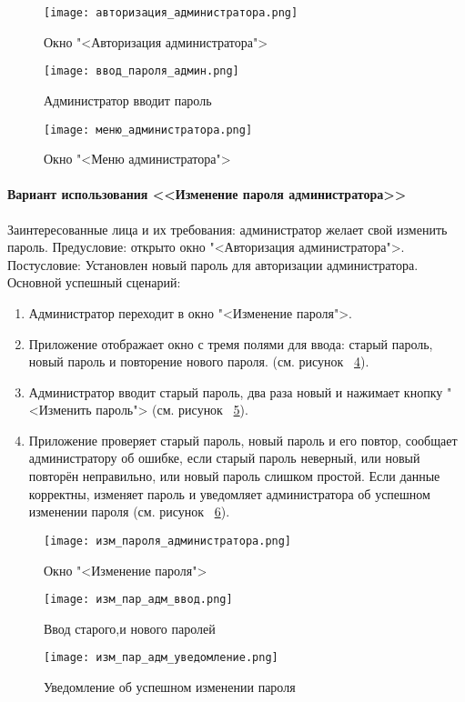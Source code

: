 \begin{figure}[ht]
	\centering
	\texttt{[image: авторизация\_администратора.png]}
	\caption{Окно "<Авторизация администратора">}
	\label{admin_auth_window:image}
\end{figure}
\begin{figure}[H]
	\centering
	\texttt{[image: ввод\_пароля\_админ.png]}
	\caption{Администратор вводит пароль}
	\label{admin_password:image}
\end{figure}
\begin{figure}[H]
	\centering
	\texttt{[image: меню\_администратора.png]}
	\caption{Окно "<Меню администратора">}
	\label{admin_menu_1:image}
\end{figure}

\paragraph{Вариант использования <<Изменение пароля администратора>>}

Заинтересованные лица и их требования: администратор желает свой изменить пароль.
\newline Предусловие: открыто окно "<Авторизация администратора">.
\newline Постусловие: Установлен новый пароль для авторизации администратора.
\newline Основной успешный сценарий:
\begin{enumerate}
	\item Администратор переходит в окно "<Изменение пароля">.
	\item Приложение отображает окно с тремя полями для ввода: старый пароль, новый пароль и повторение нового пароля. (см. рисунок ~\ref{admin_password_ch:image}).
	\item Администратор вводит старый пароль, два раза новый и нажимает кнопку "<Изменить пароль"> (см. рисунок ~\ref{admin_password_input:image}).
	\item Приложение проверяет старый пароль, новый пароль и его повтор, сообщает администратору об ошибке, если старый пароль неверный, или новый повторён неправильно, или новый пароль слишком простой. Если данные корректны, изменяет пароль и уведомляет администратора об успешном изменении пароля (см. рисунок ~\ref{admin_password_notif:image}).
\end{enumerate}

\begin{figure}[H]
	\centering
	\texttt{[image: изм\_пароля\_администратора.png]}
	\caption{Окно "<Изменение пароля">}
	\label{admin_password_ch:image}
\end{figure}
\begin{figure}[H]
	\centering
	\texttt{[image: изм\_пар\_адм\_ввод.png]}
	\caption{Ввод старого,и нового паролей}
	\label{admin_password_input:image}
\end{figure}
\begin{figure}[H]
	\centering
	\texttt{[image: изм\_пар\_адм\_уведомление.png]}
	\caption{Уведомление об успешном изменении пароля}
	\label{admin_password_notif:image}
\end{figure}

